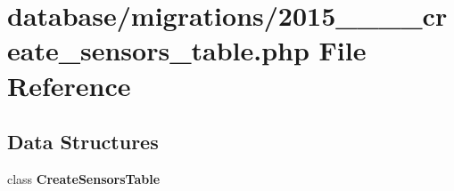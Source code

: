 \section{database/migrations/2015\+\_\+\_\+\_\+\_\+create\+\_\+sensors\+\_\+table.php File Reference}
\label{2015__03__10__193718__create__sensors__table_8php}
\subsection*{Data Structures}
\begin{DoxyCompactItemize}
\item 
class {\bf Create\+Sensors\+Table}
\end{DoxyCompactItemize}
